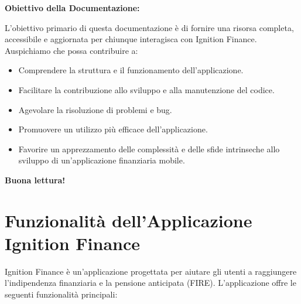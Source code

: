 \documentclass{article}
\begin{document}
\textbf{Obiettivo della Documentazione:}

L'obiettivo primario di questa documentazione è di fornire una risorsa completa,
accessibile e aggiornata per chiunque interagisca con Ignition Finance.
Auspichiamo che possa contribuire a:

\begin{itemize}
    \item Comprendere la struttura e il funzionamento dell'applicazione.
    \item Facilitare la contribuzione allo sviluppo e alla manutenzione del
    codice.
    \item Agevolare la risoluzione di problemi e bug.
    \item Promuovere un utilizzo più efficace dell'applicazione.
    \item Favorire un apprezzamento delle complessità e delle sfide intrinseche
    allo sviluppo di un'applicazione finanziaria mobile.
\end{itemize}

\vspace{0.5cm}

\textbf{Buona lettura!}
\vspace{2cm}
\vspace{0.5cm}
\section{Funzionalità dell'Applicazione Ignition
Finance}\label{sec:funzionalita-dell'applicazione-ignition-finance}

Ignition Finance è un'applicazione progettata per aiutare gli utenti a
raggiungere l'indipendenza finanziaria e la pensione anticipata (FIRE).
L'applicazione offre le seguenti funzionalità principali:
\end{document}
